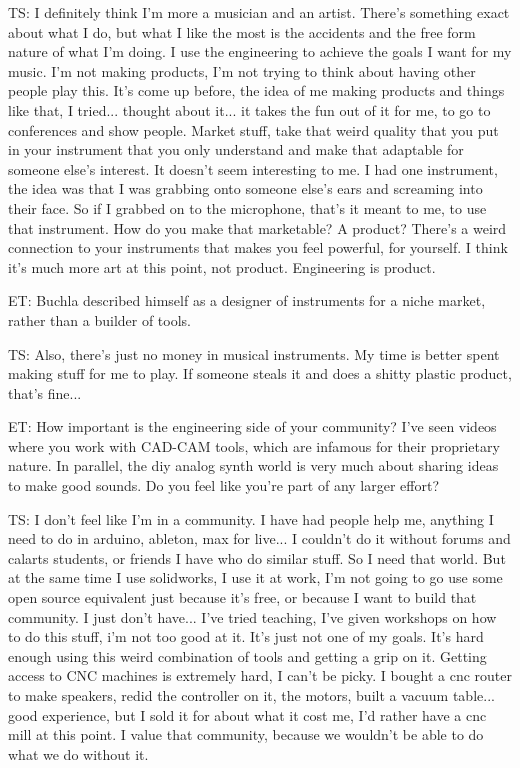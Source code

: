 TS: I definitely think I'm more a musician and an artist. There's something exact about what I do, but what I like the most is the accidents and the free form nature of what I'm doing. I use the engineering to achieve the goals I want for my music. I'm not making products, I'm not trying to think about having other people play this. It's come up before, the idea of me making products and things like that, I tried... thought about it... it takes the fun out of it for me, to go to conferences and show people. Market stuff, take that weird quality that you put in your instrument that you only understand and make that adaptable for someone else's interest. It doesn't seem interesting to me. I had one instrument, the idea was that I was grabbing onto someone else's ears and screaming into their face. So if I grabbed on to the microphone, that's it meant to me, to use that instrument. How do you make that marketable? A product? There's a weird connection to your instruments that makes you feel powerful, for yourself. I think it's much more art at this point, not product. Engineering is product. 

ET: Buchla described himself as a designer of instruments for a niche market, rather than a builder of tools. 

TS: Also, there's just no money in musical instruments. My time is better spent making stuff for me to play. If someone steals it and does a shitty plastic product, that's fine... 

ET: How important is the engineering side of your community? I've seen videos where you work with CAD-CAM tools, which are infamous for their proprietary nature. In parallel, the diy analog synth world is very much about sharing ideas to make good sounds. Do you feel like you're part of any larger effort? 

TS: I don't feel like I'm in a community. I have had people help me, anything I need to do in arduino, ableton, max for live... I couldn't do it without forums and calarts students, or friends I have who do similar stuff. So I need that world. But at the same time I use solidworks, I use it at work, I'm not going to go use some open source equivalent just because it's free, or because I want to build that community. I just don't have... I've tried teaching, I've given workshops on how to do this stuff, i'm not too good at it. It's just not one of my goals. It's hard enough using this weird combination of tools and getting a grip on it. Getting access to CNC machines is extremely hard, I can't be picky. I bought a cnc router to make speakers, redid the controller on it, the motors, built a vacuum table... good experience, but I sold it for about what it cost me, I'd rather have a cnc mill at this point. I value that community, because we wouldn't be able to do what we do without it. 


